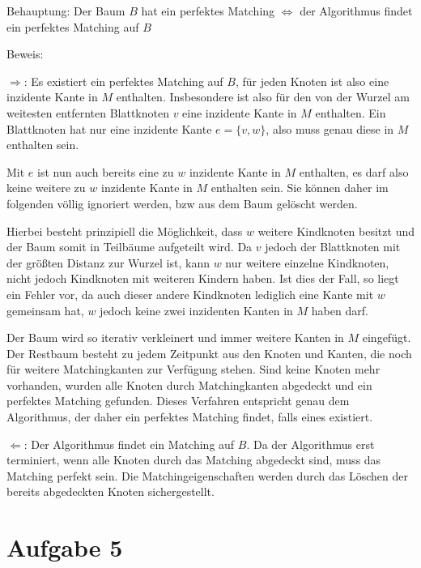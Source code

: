 \documentclass[a4paper]{article}
\begin{document}
Behauptung: Der Baum $B$ hat ein perfektes Matching $\Leftrightarrow$ der
Algorithmus findet ein perfektes Matching auf $B$

Beweis:

$\Rightarrow$: Es existiert ein perfektes Matching auf $B$, für jeden Knoten
ist also eine inzidente Kante in $M$ enthalten. Insbesondere ist also für
den von der Wurzel am weitesten entfernten Blattknoten $v$ eine inzidente Kante
in $M$ enthalten. Ein Blattknoten hat nur eine inzidente Kante $e = \{v, w\}$, also muss
genau diese in $M$ enthalten sein.

Mit $e$ ist nun auch bereits eine zu $w$ inzidente Kante in $M$ enthalten,
es darf also keine weitere zu $w$ inzidente Kante in $M$ enthalten sein.
Sie können daher im folgenden völlig ignoriert werden, bzw aus dem Baum
gelöscht werden.

Hierbei besteht prinzipiell die Möglichkeit, dass $w$ weitere Kindknoten
besitzt und der Baum somit in Teilbäume aufgeteilt wird. Da $v$ jedoch der
Blattknoten mit der größten Distanz zur Wurzel ist, kann $w$ nur weitere
einzelne Kindknoten, nicht jedoch Kindknoten mit weiteren Kindern haben.
Ist dies der Fall, so liegt ein Fehler vor, da auch dieser andere Kindknoten
lediglich eine Kante mit $w$ gemeinsam hat, $w$ jedoch keine zwei inzidenten
Kanten in $M$ haben darf.

Der Baum wird so iterativ verkleinert und immer weitere Kanten in $M$
eingefügt. Der Restbaum besteht zu jedem Zeitpunkt aus den Knoten und
Kanten, die noch für weitere Matchingkanten zur Verfügung stehen.
Sind keine Knoten mehr vorhanden, wurden alle Knoten durch Matchingkanten
abgedeckt und ein perfektes Matching gefunden.
Dieses Verfahren entspricht genau dem Algorithmus, der daher ein perfektes
Matching findet, falls eines existiert.

$\Leftarrow$: Der Algorithmus findet ein Matching auf $B$. Da der
Algorithmus erst terminiert, wenn alle Knoten durch das Matching abgedeckt
sind, muss das Matching perfekt sein. Die Matchingeigenschaften werden durch
das Löschen der bereits abgedeckten Knoten sichergestellt.

\section{Aufgabe 5}
\end{document}
